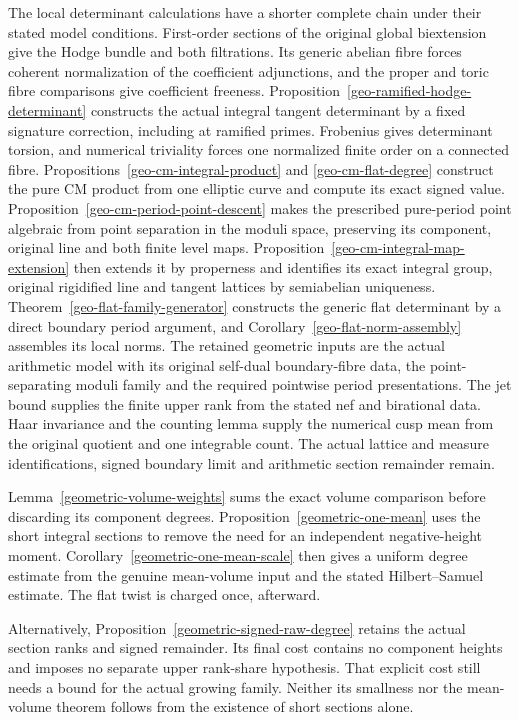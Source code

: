 The local determinant calculations have a shorter complete chain under
their stated model conditions. First-order sections of the original
global biextension give the Hodge bundle and both filtrations. Its
generic abelian fibre forces coherent normalization of the coefficient
adjunctions, and the proper and toric fibre comparisons give coefficient
freeness. Proposition~\ref{geo-ramified-hodge-determinant} constructs the
actual integral tangent determinant by a fixed signature correction,
including at ramified primes. Frobenius gives determinant torsion, and
numerical triviality forces one normalized finite order on a connected
fibre. Propositions~\ref{geo-cm-integral-product} and
\ref{geo-cm-flat-degree} construct the pure CM product from one elliptic
curve and compute its exact signed value.
Proposition~\ref{geo-cm-period-point-descent} makes the prescribed
pure-period point algebraic from point separation in the moduli space,
preserving its component, original line and both finite level maps.
Proposition~\ref{geo-cm-integral-map-extension} then extends it by
properness and identifies its exact integral group, original rigidified
line and tangent lattices by semiabelian uniqueness.
Theorem~\ref{geo-flat-family-generator} constructs the generic flat
determinant by a direct boundary period argument, and
Corollary~\ref{geo-flat-norm-assembly} assembles its local norms.
The retained geometric inputs are the actual arithmetic model with its
original self-dual boundary-fibre data, the point-separating moduli
family and the required pointwise period presentations. The jet bound
supplies the finite upper rank from the stated nef and birational data.
Haar invariance and the counting lemma supply the numerical cusp mean
from the original quotient and one integrable count. The actual lattice
and measure identifications, signed boundary limit and arithmetic
section remainder remain.

Lemma~\ref{geometric-volume-weights} sums the exact
volume comparison before discarding its component degrees.
Proposition~\ref{geometric-one-mean} uses the short integral sections
to remove the need for an independent negative-height moment.
Corollary~\ref{geometric-one-mean-scale} then gives a uniform degree
estimate from the genuine mean-volume input and the stated
Hilbert--Samuel estimate. The flat twist is charged once, afterward.

Alternatively, Proposition~\ref{geometric-signed-raw-degree} retains
the actual section ranks and signed remainder. Its final cost contains
no component heights and imposes no separate upper rank-share
hypothesis. That explicit cost still needs a bound for the actual
growing family. Neither its smallness nor the mean-volume theorem
follows from the existence of short sections alone.

